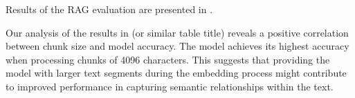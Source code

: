 Results of the \ac{RAG} evaluation are presented in .


Our analysis of the results in  (or similar table title) reveals a positive correlation between chunk size and model accuracy.
The model achieves its highest accuracy when processing chunks of 4096 characters.
This suggests that providing the model with larger text segments during the embedding process might contribute to improved performance in capturing semantic relationships within the text.


